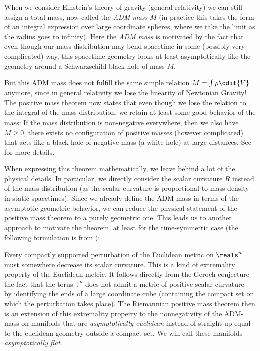 \documentclass[titlepage,numbers=noenddot,oneside,%
cleardoublepage=empty,paper=a4,fontsize=11pt,%
english,%
]{scrartcl}
\begin{document}
When we consider Einstein's theory of gravity (\ie general relativity) we can still assign a total mass, now called the \emph{ADM mass} \( M \) (in practice this takes the form of an integral expression over large coordinate spheres, where we take the limit as the radius goes to infinity). Here the \emph{ADM mass} is motivated by the fact that even though our mass distribution may bend spacetime in some (possibly very complicated) way, this spacetime geometry looks at least asymptotically like the geometry around a Schwarzschild black hole of mass \( M \).

But this ADM mass does not fulfill the same simple relation \( M=\int \rho\odif{V} \) anymore, since in general relativity we lose the linearity of Newtonian Gravity! The positive mass theorem now states that even though we lose the relation to the integral of the mass distribution, we retain at least some good behavior of the mass: If the mass distribution is non-negative everywhere, then we also have \( M\geq 0 \), \ie there exists no configuration of positive masses (however complicated) that acts like a black hole of negative mass (a white hole) at large distances. See \cite[Chapter 7]{leeGeometricRelativity2019} for more details.

When expressing this theorem mathematically, we leave behind a lot of the physical details. In particular, we directly consider the scalar curvature \( R \) instead of the mass distribution (as the scalar curvature is proportional to mass density in static spacetimes). Since we already define the ADM mass in terms of the asymptotic geometric behavior, we can reduce the physical statement of the positive mass theorem to a purely geometric one. This leads us to another approach to motivate the theorem, at least for the time-symmetric case (the following formulation is from \cite[1]{braySpacetimeHarmonicFunctions2021}):

Every compactly supported perturbation of the Euclidean metric on \( \reals^n \) must somewhere decrease its scalar curvature. This is a kind of extremality property of the Euclidean metric. It follows directly from the Geroch conjecture -- the fact that the torus \( \mathbb{T}^n \) does not admit a metric of positive scalar curvature -- by identifying the ends of a large coordinate cube (containing the compact set on which the perturbation takes place). The Riemannian positive mass theorem then is an extension of this extremality property to the nonnegativity of the ADM-mass on manifolds that are \emph{asymptotically euclidean} instead of straight up equal to the euclidean geometry outside a compact set. We will call these manifolds \emph{asymptotically flat}.
\end{document}
